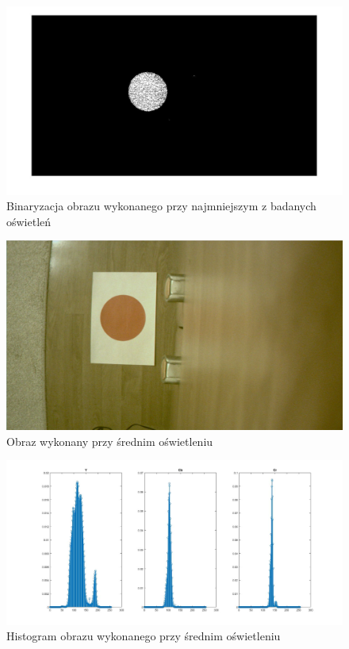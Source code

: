 \begin{figure}[h]
	\centering
	\includegraphics[width=\textwidth]{bin1.jpg}
	\caption{Binaryzacja obrazu wykonanego przy najmniejszym z badanych oświetleń}
	\label{fig:bin1}
\end{figure}
\begin{figure}[h]
	\centering
	\includegraphics[width=\textwidth]{osw2.jpg}
	\caption{Obraz wykonany przy średnim oświetleniu}
	\label{fig:osw2}
\end{figure}
\begin{figure}[h]
	\centering
	\includegraphics[width=\textwidth]{hist2.jpg}
	\caption{Histogram obrazu wykonanego przy średnim oświetleniu}
	\label{fig:hist2}
\end{figure}
